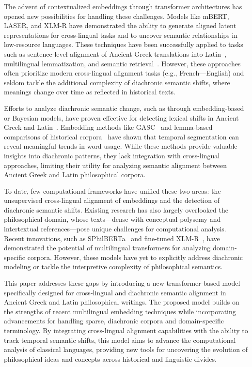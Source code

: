 \documentclass[11pt]{article} %
\begin{document}
The advent of contextualized embeddings through transformer architectures has opened new possibilities for handling these challenges. Models like mBERT, LASER, and XLM-R have demonstrated the ability to generate aligned latent representations for cross-lingual tasks and to uncover semantic relationships in low-resource languages. These techniques have been successfully applied to tasks such as sentence-level alignment of Ancient Greek translations into Latin~\cite{Craig2023TestingTL,Yousef2022AnAM}, multilingual lemmatization, and semantic retrieval~\cite{riemenschneider2023graeciacaptaferumvictorem,krahn2023sentenceembeddingmodelsancient}. However, these approaches often prioritize modern cross-lingual alignment tasks (e.g., French—English) and seldom tackle the additional complexity of diachronic semantic shifts, where meanings change over time as reflected in historical texts.

Efforts to analyze diachronic semantic change, such as through embedding-based or Bayesian models, have proven effective for detecting lexical shifts in Ancient Greek and Latin~\cite{Perrone2021LexicalSC,sprugnoliBuildingComparingLemma2020,mcgillivrayComputationalApproachLexical2019}. Embedding methods like GASC~\cite{Perrone2021LexicalSC} and lemma-based comparisons of historical corpora~\cite{sprugnoliBuildingComparingLemma2020} have shown that temporal segmentation can reveal meaningful trends in word usage. While these methods provide valuable insights into diachronic patterns, they lack integration with cross-lingual approaches, limiting their utility for analyzing semantic alignment between Ancient Greek and Latin philosophical corpora.

To date, few computational frameworks have unified these two areas: the unsupervised cross-lingual alignment of embeddings and the detection of diachronic semantic shifts. Existing research has also largely overlooked the philosophical domain, whose texts---dense with conceptual polysemy and intertextual references---pose unique challenges for computational analysis. Recent innovations, such as SPhilBERTa~\cite{riemenschneider2023graeciacaptaferumvictorem} and fine-tuned XLM-R~\cite{Yousef2022AnAM}, have demonstrated the potential of multilingual transformers for analyzing domain-specific corpora. However, these models have yet to explicitly address diachronic modeling or tackle the interpretive complexity of philosophical semantics.

This paper addresses these gaps by introducing a new transformer-based model specifically designed for cross-lingual and diachronic semantic alignment in Ancient Greek and Latin philosophical writings. The proposed model builds on the strengths of recent multilingual embedding techniques while incorporating advancements for handling sparse, diachronic corpora and domain-specific terminology. By integrating cross-lingual alignment capabilities with the ability to track temporal semantic shifts, this model aims to advance the computational analysis of classical languages, providing new tools for uncovering the evolution of philosophical ideas and concepts across historical and linguistic divides.
\end{document}
